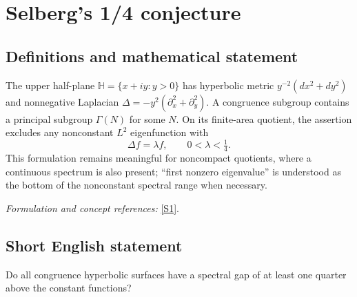 \documentclass[11pt]{article}
\newcommand{\sref}[2]{\hyperlink{source:#1:#2}{[S#2]}}
\newif\ifshowcatalogue
\newcommand{\cataloguescope}[1]{\ifshowcatalogue
 \paragraph{Exact scope in the supplied catalogue.}
 \begin{quote}\small #1\end{quote}\fi}
\begin{document}
\setcounter{section}{0}
\clearpage
\section*{\texorpdfstring{Selberg's 1/4 conjecture}{Selberg's 1/4 conjecture}}\label{9400079}
\subsection{Definitions and mathematical statement}
The upper half-plane $\mathbb H=\{x+iy:y>0\}$ has hyperbolic metric $y^{-2}(dx^2+dy^2)$ and nonnegative Laplacian $\Delta=-y^2(\partial_x^2+\partial_y^2)$. A congruence subgroup contains a principal subgroup $\Gamma(N)$ for some $N$. On its finite-area quotient, the assertion excludes any nonconstant $L^2$ eigenfunction with
\[
 \Delta f=\lambda f,\qquad0<\lambda<\tfrac14.
\]
This formulation remains meaningful for noncompact quotients, where a continuous spectrum is also present; ``first nonzero eigenvalue'' is understood as the bottom of the nonconstant spectral range when necessary.
\par\smallskip\textit{Formulation and concept references:} \sref{9400079}{1}.
\cataloguescope{Prove that the first nonzero eigenvalue lambda\_1 of the Laplace-Beltrami operator on every congruence quotient of the upper half-plane is at least 1/4.}
\subsection{Short English statement}
Do all congruence hyperbolic surfaces have a spectral gap of at least one quarter above the constant functions?
\end{document}
